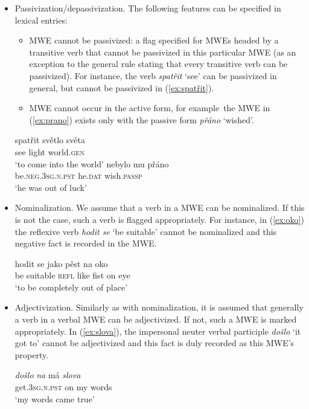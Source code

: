 \documentclass[output=paper,colorlinks,citecolor=brown]{langscibook}
\begin{document}
\begin{itemize}
    \item Passivization/depassivization. The following features can be specified in lexical entries:
\begin{itemize}
    \item MWE cannot be passivized: a flag specified for 
    MWEs headed by a transitive verb that cannot be passivized  in this particular MWE (as an exception to the general rule stating that every transitive verb 
    can be passivized). For instance, the verb \emph{spatřit} `see' can be passivized in general, but cannot be passivized in (\ref{ex:spatřit}). 


    \item MWE cannot occur in the active form, for example\ the MWE in (\ref{ex:prano}) exists only with the passive form \emph{přáno} ‘wished’.

\end{itemize}

\ea \label{ex:spatřit}
\gll spatřit světlo světa\\ 
     see light world.\textsc{gen}\\
\glt `to come into the world'
\ex \label{ex:prano}
\gll nebylo mu přáno\\
     be.\textsc{neg}.\textsc{3sg.n.pst} he.\textsc{dat} wish.\textsc{passp}\\
\glt `he was out of luck'
\z

   \item Nominalization. We assume that a verb in a MWE can be nominalized. If this is not the case, such a verb
is flagged appropriately. For instance, in (\ref{ex:oko}) the reflexive verb \emph{hodit se} ‘be suitable’ cannot be nominalized and this
negative fact is recorded in the MWE.

\ea \label{ex:oko}
\gll hodit se jako pěst na oko\\
     {be suitable} \textsc{refl} like fist on eye\\
\glt `to be completely out of place'
\z


   \item Adjectivization. Similarly as with nominalization, it is assumed that generally a verb in a verbal MWE can be adjectivized. If not, such a MWE is marked appropriately. In (\ref{ex:slova}), the impersonal neuter verbal participle \emph{došlo} ‘it got to’
cannot be adjectivized and this fact is duly recorded as this MWE's
property.


\ea \label{ex:slova}
\gll \emph{došlo} \emph{na} má \emph{slova}\\
     get.\textsc{3sg.n}.\textsc{pst} on my words\\
\glt `my words came true'
\z

\end{itemize}
\end{document}
